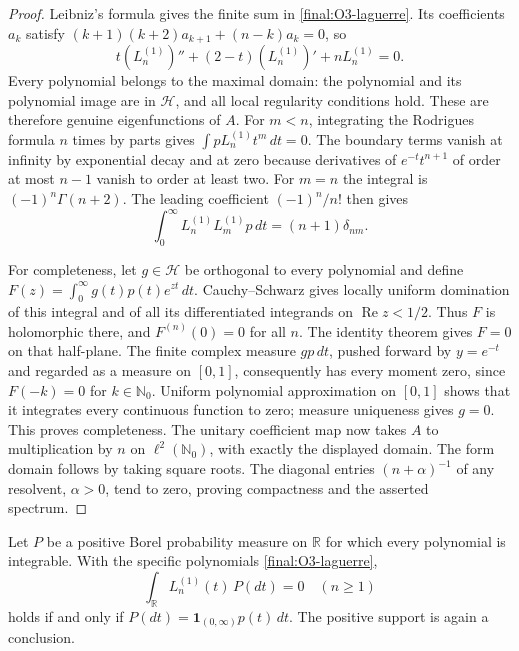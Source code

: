 \begin{proof}
Leibniz's formula gives the finite sum in
\eqref{final:O3-laguerre}.  Its coefficients $a_k$ satisfy
$(k+1)(k+2)a_{k+1}+(n-k)a_k=0$, so
\[
 t(L_n^{(1)})''+(2-t)(L_n^{(1)})'+nL_n^{(1)}=0.
\]
Every polynomial belongs to the maximal domain: the polynomial and
its polynomial image are in $\mathcal H$, and all local regularity
conditions hold.  These are therefore genuine eigenfunctions of $A$.
For $m<n$, integrating the Rodrigues formula $n$ times by parts gives
$\int pL_n^{(1)}t^m\,dt=0$.  The boundary terms vanish at infinity
by exponential decay and at zero because derivatives of
$e^{-t}t^{n+1}$ of order at most $n-1$ vanish to order at least two.
For $m=n$ the integral is $(-1)^n\Gamma(n+2)$.
The leading coefficient $(-1)^n/n!$ then gives
\[
 \int_0^\infty L_n^{(1)}L_m^{(1)}p\,dt=(n+1)\delta_{nm}.
\]

For completeness, let $g\in\mathcal H$ be orthogonal to every
polynomial and define
$F(z)=\int_0^\infty g(t)p(t)e^{zt}\,dt$.
Cauchy--Schwarz gives locally uniform domination of this integral
and of all its differentiated integrands on $\operatorname{Re}z<1/2$.
Thus $F$ is holomorphic there, and $F^{(n)}(0)=0$ for all $n$.
The identity theorem gives $F=0$ on that half-plane.
The finite complex measure $gp\,dt$, pushed forward by $y=e^{-t}$
and regarded as a measure on $[0,1]$, consequently has every moment
zero, since $F(-k)=0$ for $k\in\mathbb N_0$.
Uniform polynomial approximation on $[0,1]$ shows that it integrates
every continuous function to zero; measure uniqueness gives $g=0$.
This proves completeness.
The unitary coefficient map now takes $A$ to multiplication by $n$
on $\ell^2(\mathbb N_0)$, with exactly the displayed domain.
The form domain follows by taking square roots.  The diagonal
entries $(n+\alpha)^{-1}$ of any resolvent, $\alpha>0$, tend to zero,
proving compactness and the asserted spectrum.
\end{proof}

\begin{theorem}
\label{final:O7}
Let $P$ be a positive Borel probability measure on $\mathbb R$ for
which every polynomial is integrable.  With the specific polynomials
\eqref{final:O3-laguerre},
\[
 \int_{\mathbb R}L_n^{(1)}(t)\,P(dt)=0\quad(n\geq1)
\]
holds if and only if $P(dt)=\mathbf1_{(0,\infty)}p(t)\,dt$.
The positive support is again a conclusion.
\end{theorem}

